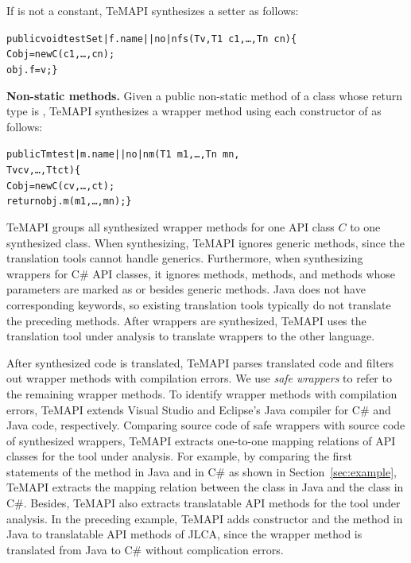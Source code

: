 If  is not a constant, TeMAPI synthesizes a setter as follows:

\begin{CodeOut}\vspace*{-1.5ex}
\begin{alltt}
 public void testSet|f.name||no|nfs(T v, T1\ c1,\ldots, Tn\ cn)\{
   C obj = new C(c1,\ldots, cn);
   obj.f = v; \}
\end{alltt}
\end{CodeOut}\vspace*{-1.5ex}

\textbf{Non-static methods.} Given a public non-static method  of a class  whose return type is , TeMAPI synthesizes a wrapper method using each constructor  of  as follows:

\begin{CodeOut}\vspace*{-1.5ex}
\begin{alltt}
 public Tm test|m.name||no|nm(T1\ m1,\ldots, Tn\ mn,
                            Tv cv, \ldots, Tt ct)\{
   C obj = new C(cv,\ldots, ct);
   return obj.m(m1,\ldots, mn); \}
\end{alltt}
\end{CodeOut}\vspace*{-1.5ex}


TeMAPI groups all synthesized wrapper methods for one API class $C$ to one synthesized class. When synthesizing, TeMAPI ignores generic methods, since the translation tools cannot handle generics. Furthermore, when synthesizing wrappers for C\# API classes, it ignores  methods,  methods, and methods whose parameters are marked as  or  besides generic methods. Java does not have corresponding keywords, so existing translation tools typically do not translate the preceding methods. After wrappers are synthesized, TeMAPI uses the translation tool under analysis to translate wrappers to the other language.

After synthesized code is translated, TeMAPI parses translated code and filters out wrapper methods with compilation errors. We use \emph{safe wrappers} to refer to the remaining wrapper methods. To identify wrapper methods with compilation errors, TeMAPI extends Visual Studio and Eclipse's Java compiler for C\# and Java code, respectively. Comparing source code of safe wrappers with source code of synthesized wrappers, TeMAPI extracts one-to-one mapping relations of API classes for the tool under analysis. For example, by comparing the first statements of the  method in Java and in C\# as shown in Section~\ref{sec:example}, TeMAPI extracts the mapping relation between the  class in Java and the  class in C\#. Besides, TeMAPI also extracts translatable API methods for the tool under analysis. In the preceding example, TeMAPI adds  constructor and the  method in Java to translatable API methods of JLCA, since the wrapper method is translated from Java to C\# without complication errors.

